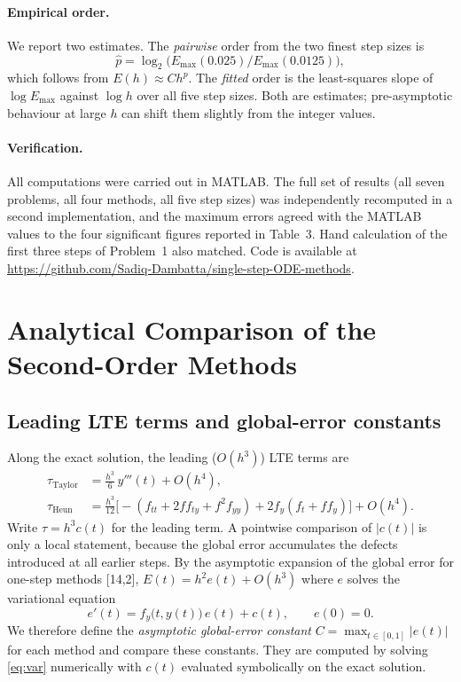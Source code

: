 \documentclass[10pt,letterpaper]{article}
\begin{document}
\paragraph{Empirical order.} We report two estimates. The \emph{pairwise} order from the two finest step sizes is
\begin{equation}
\hat p=\log_2\!\big(E_{\max}(0.025)/E_{\max}(0.0125)\big),
\end{equation}
which follows from $E(h)\approx Ch^p$. The \emph{fitted} order is the least-squares slope of $\log E_{\max}$ against $\log h$ over all five step sizes. Both are estimates; pre-asymptotic behaviour at large $h$ can shift them slightly from the integer values.

\paragraph{Verification.} All computations were carried out in MATLAB. The full set of results (all seven problems, all four methods, all five step sizes) was independently recomputed in a second implementation, and the maximum errors agreed with the MATLAB values to the four significant figures reported in Table~3. Hand calculation of the first three steps of Problem~1 also matched. Code is available at \url{https://github.com/Sadiq-Dambatta/single-step-ODE-methods}.

\section{Analytical Comparison of the Second-Order Methods}
\subsection{Leading LTE terms and global-error constants}
Along the exact solution, the leading ($O(h^3)$) LTE terms are
\begin{align}
\tau_{\text{Taylor}}&=\frac{h^3}{6}\,y'''(t)+O(h^4),\label{eq:tt}\\
\tau_{\text{Heun}}&=\frac{h^3}{12}\Big[-(f_{tt}+2ff_{ty}+f^2f_{yy})+2f_y(f_t+ff_y)\Big]+O(h^4).\label{eq:th}
\end{align}
Write $\tau=h^3c(t)$ for the leading term. A pointwise comparison of $|c(t)|$ is only a local statement, because the global error accumulates the defects introduced at all earlier steps. By the asymptotic expansion of the global error for one-step methods [14,2], $E(t)=h^2e(t)+O(h^3)$ where $e$ solves the variational equation
\begin{equation}
e'(t)=f_y\big(t,y(t)\big)\,e(t)+c(t),\qquad e(0)=0.\label{eq:var}
\end{equation}
We therefore define the \emph{asymptotic global-error constant} $C=\max_{t\in[0,1]}|e(t)|$ for each method and compare these constants. They are computed by solving \eqref{eq:var} numerically with $c(t)$ evaluated symbolically on the exact solution.
\end{document}
